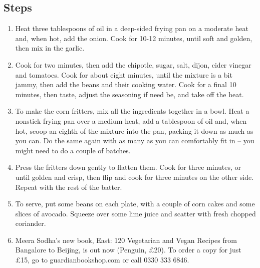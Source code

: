 \documentclass{book}
\begin{document}
\subsection*{Steps}
\begin{enumerate}
\item Heat three tablespoons of oil in a deep-sided frying pan on a moderate heat and, when hot, add the onion. Cook for 10-12 minutes, until soft and golden, then mix in the garlic. 
\item Cook for two minutes, then add the chipotle, sugar, salt, dijon, cider vinegar and tomatoes. Cook for about eight minutes, until the mixture is a bit jammy, then add the beans and their cooking water. Cook for a final 10 minutes, then taste, adjust the seasoning if need be, and take off the heat.
\item To make the corn fritters, mix all the ingredients together in a bowl. Heat a nonstick frying pan over a medium heat, add a tablespoon of oil and, when hot, scoop an eighth of the mixture into the pan, packing it down as much as you can. Do the same again with as many as you can comfortably fit in – you might need to do a couple of batches. 
\item Press the fritters down gently to flatten them. Cook for three minutes, or until golden and crisp, then flip and cook for three minutes on the other side. Repeat with the rest of the batter.
\item To serve, put some beans on each plate, with a couple of corn cakes and some slices of avocado. Squeeze over some lime juice and scatter with fresh chopped coriander.
\item Meera Sodha’s new book, East: 120 Vegetarian and Vegan Recipes from Bangalore to Beijing, is out now (Penguin, £20). To order a copy for just £15, go to guardianbookshop.com or call 0330 333 6846.
\end{enumerate}
\newpage
\end{document}
